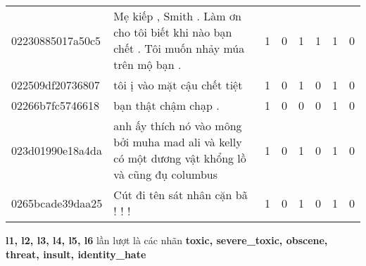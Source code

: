 \begin{center}
\begin{sidewaystable}[htb]
\begin{tabularx}{\textwidth}{L{0.8} L{6.6} C{0.1} C{0.1} C{0.1} C{0.1} C{0.1} C{0.1}}
            02230885017a50c5 & Mẹ kiếp , Smith . Làm ơn cho tôi biết khi nào bạn chết . Tôi muốn nhảy múa trên mộ bạn .                                          & 1           & 0           & 1           & 1           & 1           & 0           \\
            022509df20736807 & tôi ị vào mặt cậu chết tiệt                                                                                                       & 1           & 0           & 1           & 0           & 1           & 0           \\
            02266b7fc5746618 & bạn thật chậm chạp .                                                                                                              & 1           & 0           & 0           & 0           & 1           & 0           \\
            023d01990e18a4da & anh ấy thích nó vào mông bởi muha mad ali và kelly có một dương vật khổng lồ và cũng đụ columbus                                  & 1           & 0           & 1           & 0           & 1           & 0           \\
            0265bcade39daa25 & Cút đi tên sát nhân cặn bã ! ! !                                                                                                  & 1           & 0           & 1           & 0           & 1           & 0           \\
            \bottomrule
        \end{tabularx}
        {
        \fontsize{8pt}{12pt}\selectfont
        \textbf{l1, l2, l3, l4, l5, l6} lần lượt là các nhãn \textbf{toxic, severe\_toxic, obscene, threat, insult, identity\_hate}
        }
    \end{sidewaystable}
\end{center}